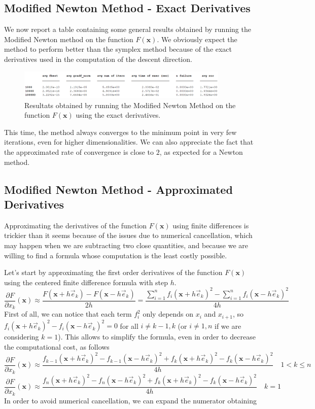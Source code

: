 \medskip
\subsection*{Modified Newton Method - Exact Derivatives}
We now report a table containing some general results obtained by running the Modified Newton method on the function $F(\mathbf{x})$.
We obviously expect the method to perform better than the symplex method because of the exact derivatives used in the computation of the descent direction.

\begin{figure}[htbp]
    \centering
    \includegraphics[width = 0.9\textwidth]{img/pb76_table_MN.png}
    \caption{Resultats obtained by running the Modified Newton Method on the function $F(\mathbf{x})$ using the exact derivatives.}
\end{figure}

This time, the method always converges to the minimum point in very few iterations, even for higher dimensionalities. 
We can also appreciate the fact that the approximated rate of convergence is close to $2$, as expected for a Newton method.


\medskip
\subsection*{Modified Newton Method - Approximated Derivatives}
Approximating the derivatives of the function $F(\mathbf{x})$ using finite differences is trickier than it seems because of the issues due to numerical cancellation, which may happen when we are subtracting two close quantities, and because we are willing to find a formula whose computation is the least costly possible.

Let's start by approximating the first order derivatives of the function $F(\mathbf{x})$ using the centered finite difference formula with step $h$.
$$ \frac{\partial F }{\partial x_k} (\mathbf{x}) \approx \frac{F(\mathbf{x} + h \vec{e}_k) - F(\mathbf{x} - h \vec{e}_k)}{2h} = 
\frac{\sum_{i = 1}^{n} f_i(\mathbf{x} + h \vec{e}_k)^2 - \sum_{i = 1}^{n} f_i(\mathbf{x} - h \vec{e}_k)^2}{4h}$$
First of all, we can notice that each term $f_i^2$ only depends on $x_i$ and $x_{i+1}$, so $f_i(\mathbf{x} + h \vec{e}_k)^2 - f_i(\mathbf{x} - h \vec{e}_k)^2 = 0$ for all $i \neq k-1, k$ (or $i \neq 1,n$ if we are considering $k = 1$). 
This allows to simplify the formula, even in order to decrease the computational cost, as follows
$$\frac{\partial F }{\partial x_k} (\mathbf{x}) \approx  \frac{f_{k-1}(\mathbf{x} + h \vec{e}_k)^2 - f_{k-1}(\mathbf{x} - h \vec{e}_k)^2 + f_{k}(\mathbf{x} + h \vec{e}_k)^2 - f_{k}(\mathbf{x} - h \vec{e}_k)^2}{4h}  \quad 1 < k \leq n$$
$$\frac{\partial F }{\partial x_k} (\mathbf{x}) \approx  \frac{f_{n}(\mathbf{x} + h \vec{e}_k)^2 - f_{n}(\mathbf{x} - h \vec{e}_k)^2 + f_{k}(\mathbf{x} + h \vec{e}_k)^2 - f_{k}(\mathbf{x} - h \vec{e}_k)^2}{4h}  \quad k = 1$$
In order to avoid numerical cancellation, we can expand the numerator obtaining

